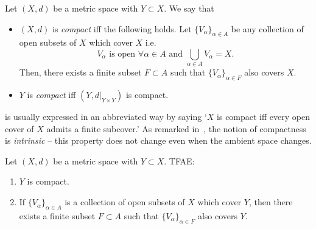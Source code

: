 \begin{defn}[Compact]
	\label{defn:cpct}
Let $(X,d)$ be a metric space with $Y\subset X$. We say that
\begin{itemize}
	\item $(X,d)$ is \textit{compact} iff the following holds. Let $\{V_\alpha\}_{\alpha \in A}$ be any collection of open subsets of $X$ which cover $X$ i.e.
	\[
	V_\alpha\text{ is open }\forall \alpha \in A\text{ and }\bigcup_{\alpha \in A}V_\alpha = X.
	\]
	Then, there exists a finite subset $F\subset A$ such that $\{V_\alpha\}_{\alpha \in F}$ also covers $X$.
	\item $Y$ is \textit{compact} iff $(Y,d|_{Y\times Y})$ is compact.
\end{itemize}
\end{defn}
 is usually expressed in an abbreviated way by saying `$X$ is compact iff every open cover of $X$ admits a finite subcover.' As remarked in~, the notion of compactness is \textit{intrinsic} -- this property does not change even when the ambient space changes.
\begin{lemma}
\label{lem:cpct_int}
Let $(X,d)$ be a metric space with $Y\subset X$. TFAE:
\begin{enumerate}
	\item \label{cpct_int_1} $Y$ is compact.
	\item \label{cpct_int_2} If $\{V_\alpha\}_{\alpha \in A}$ is a collection of open subsets of $X$ which cover $Y$, then there exists a finite subset $F\subset A$ such that $\{V_\alpha\}_{\alpha \in F}$ also covers $Y$.
\end{enumerate}
\end{lemma}
